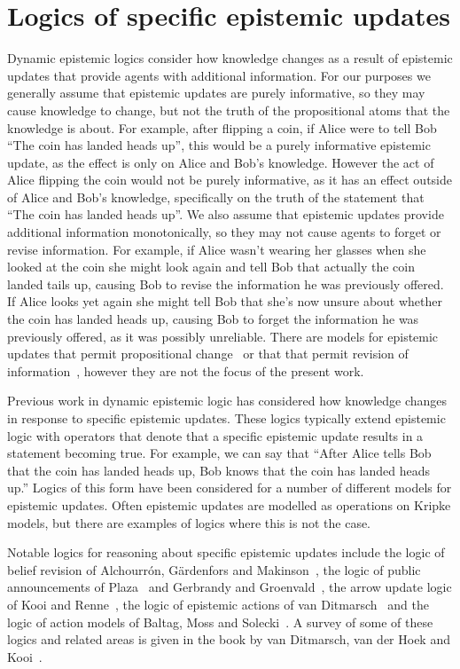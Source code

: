 \section{Logics of specific epistemic updates}

Dynamic epistemic logics consider how knowledge changes as a result of epistemic updates that provide agents with additional information.
For our purposes we generally assume that epistemic updates are purely informative, so they may cause knowledge to change, but not the truth of the propositional atoms that the knowledge is about.
For example, after flipping a coin, if Alice were to tell Bob ``The coin has landed heads up'', this would be a purely informative epistemic update, as the effect is only on Alice and Bob's knowledge.
However the act of Alice flipping the coin would not be purely informative, as it has an effect outside of Alice and Bob's knowledge, specifically on the truth of the statement that ``The coin has landed heads up''.
We also assume that epistemic updates provide additional information monotonically, so they may not cause agents to forget or revise information.
For example, if Alice wasn't wearing her glasses when she looked at the coin she might look again and tell Bob that actually the coin landed tails up, causing Bob to revise the information he was previously offered.
If Alice looks yet again she might tell Bob that she's now unsure about whether the coin has landed heads up, causing Bob to forget the information he was previously offered, as it was possibly unreliable.
There are models for epistemic updates that permit propositional change~\cite{vanbenthem:2006} or that that permit revision of information~\cite{alchourron:1985}, however they are not the focus of the present work.

Previous work in dynamic epistemic logic has considered how knowledge changes in response to specific epistemic updates.
These logics typically extend epistemic logic with operators that denote that a specific epistemic update results in a statement becoming true.
For example, we can say that ``After Alice tells Bob that the coin has landed heads up, Bob knows that the coin has landed heads up.''
Logics of this form have been considered for a number of different models for epistemic updates.
Often epistemic updates are modelled as operations on Kripke models, but there are examples of logics where this is not the case.

Notable logics for reasoning about specific epistemic updates include the logic of belief revision of Alchourr{\'o}n, G{\"a}rdenfors and Makinson~\cite{alchourron:1985}, the logic of public announcements of Plaza~\cite{plaza:1989} and Gerbrandy and Groenvald~\cite{gerbrandy:1997}, the arrow update logic of Kooi and Renne~\cite{kooi:2011a}, the logic of epistemic actions of van Ditmarsch~\cite{vanditmarsch:1999, vanditmarsch:2000, vanditmarsch:2002} and the logic of action models of Baltag, Moss and Solecki~\cite{baltag:1999, baltag:2004}.
A survey of some of these logics and related areas is given in the book by van Ditmarsch, van der Hoek and Kooi~\cite{vanditmarsch:2007}.

